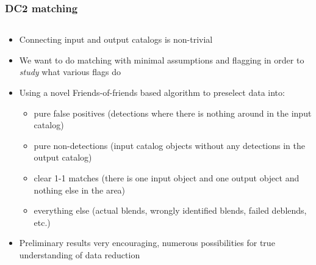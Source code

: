 \documentclass[aspectratio=169]{beamer}
\begin{document}
\begin{frame}
  \frametitle{DC2 matching}

  \begin{columns}
    \begin{column}{8cm}
      \begin{itemize}
      \item Connecting input and output catalogs is non-trivial
      
      \item We want to do matching with minimal assumptions and
        flagging in order to \emph{study} what various flags do

      \item Using a novel Friends-of-friends based algorithm to
        preselect data into:
        \begin{itemize}
          \scriptsize
        \item  pure false positives (detections where
        there is nothing around in the input catalog)

      \item pure non-detections (input catalog objects without any
         detections in the output catalog)

      \item clear 1-1 matches (there is one input object and one
        output object and nothing else in the area)

      \item everything else (actual blends, wrongly identified blends,
        failed deblends, etc.)


        \end{itemize}
      \item Preliminary results very encouraging, numerous
        possibilities for true understanding of data reduction


\end{itemize}
\end{column}
\end{columns}
\end{frame}
\end{document}
